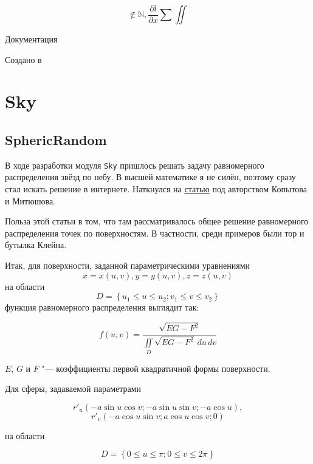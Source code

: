 \documentclass[a4paper,12pt,fleqn]{article}
\begin{document}
\begin{titlepage}
{\centering
{~\par}
\vspace{0.25\textheight}
{\Huge 
\begin{minipage}{0.4\textwidth}
\[\notin\mathbb{N},\frac{\partial l}{\partial x}\sum\iint\]
\end{minipage}
\par}
\vspace{1.0cm}
{\Large Документация \par}
\vfill
{\Large Создано в \XeLaTeX }\par}
\end{titlepage}

\tableofcontents

\section{Sky}

\subsection{SphericRandom}

В ходе разработки модуля \verb|Sky| пришлось решать задачу равномерного распределения звёзд по небу.
В высшей математике я не силён, поэтому сразу стал искать решение в интернете.
Наткнулся на \href{https://www.fundamental-research.ru/ru/article/view?id=31243}{статью} под авторством Копытова и Митюшова.

Польза этой статьи в том, что там рассматривалось общее решение равномерного распределения точек по поверхностям.
В частности, среди примеров были тор и бутылка Клейна.

Итак, для поверхности, заданной параметрическими уравнениями \[x = x(u, v), y = y(u, v), z = z(u, v)\] на области \[D = \left \{ u_1 \leqslant u \leqslant u_2; v_1 \leqslant v \leqslant v_2 \right \}\] функция равномерного распределения выглядит так:

\[f(u, v) = \frac{\sqrt{EG - F^2}}{\iint\limits_D \sqrt{EG - F^2}\,du\,dv}\]

$E$, $G$ и $F$ "--- коэффициенты первой квадратичной формы поверхности.

Для сферы, задаваемой параметрами

\[r'_u(- a \sin u \cos v; - a \sin u \sin v; - a \cos u),\]
\[r'_v(-a \cos u \sin v; a \cos u \cos v; 0)\]

на области

\[D = \left \{ 0 \leqslant u \leqslant \pi; 0 \leqslant v \leqslant 2\pi \right \}\]
\end{document}

